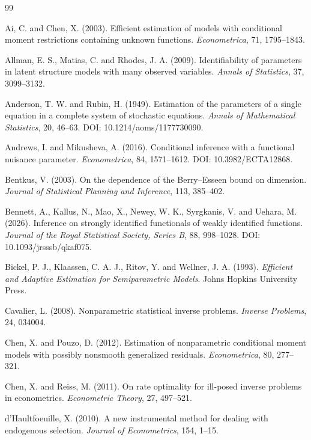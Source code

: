 \documentclass[11pt,a4paper]{ltjsarticle}
\theoremstyle{remark}
\begin{document}
\begin{thebibliography}{99}
\small

Ai, C. and Chen, X. (2003).
Efficient estimation of models with conditional moment restrictions containing unknown functions.
\emph{Econometrica}, 71, 1795--1843.


Allman, E. S., Matias, C. and Rhodes, J. A. (2009).
Identifiability of parameters in latent structure models with many observed variables.
\emph{Annals of Statistics}, 37, 3099--3132.

Anderson, T. W. and Rubin, H. (1949).
Estimation of the parameters of a single equation in a complete system of stochastic equations.
\emph{Annals of Mathematical Statistics}, 20, 46--63.
DOI: 10.1214/aoms/1177730090.

Andrews, I. and Mikusheva, A. (2016).
Conditional inference with a functional nuisance parameter.
\emph{Econometrica}, 84, 1571--1612.
DOI: 10.3982/ECTA12868.

Bentkus, V. (2003).
On the dependence of the Berry--Esseen bound on dimension.
\emph{Journal of Statistical Planning and Inference}, 113, 385--402.

Bennett, A., Kallus, N., Mao, X., Newey, W. K., Syrgkanis, V. and Uehara, M. (2026).
Inference on strongly identified functionals of weakly identified functions.
\emph{Journal of the Royal Statistical Society, Series B}, 88, 998--1028.
DOI: 10.1093/jrsssb/qkaf075.

Bickel, P. J., Klaassen, C. A. J., Ritov, Y. and Wellner, J. A. (1993).
\emph{Efficient and Adaptive Estimation for Semiparametric Models}.
Johns Hopkins University Press.

Cavalier, L. (2008).
Nonparametric statistical inverse problems.
\emph{Inverse Problems}, 24, 034004.

Chen, X. and Pouzo, D. (2012).
Estimation of nonparametric conditional moment models with possibly nonsmooth generalized residuals.
\emph{Econometrica}, 80, 277--321.

Chen, X. and Reiss, M. (2011).
On rate optimality for ill-posed inverse problems in econometrics.
\emph{Econometric Theory}, 27, 497--521.

d'Haultfoeuille, X. (2010).
A new instrumental method for dealing with endogenous selection.
\emph{Journal of Econometrics}, 154, 1--15.



\end{thebibliography}
\end{document}
